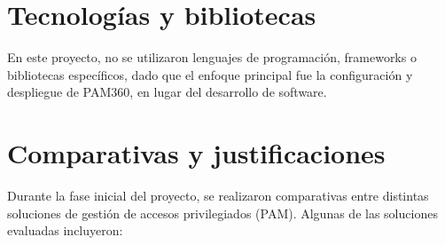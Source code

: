 \section{Tecnologías y bibliotecas}

En este proyecto, no se utilizaron lenguajes de programación, frameworks o bibliotecas específicos, dado que el enfoque principal fue la configuración y despliegue de PAM360, en lugar del desarrollo de software. 

\section{Comparativas y justificaciones}

Durante la fase inicial del proyecto, se realizaron comparativas entre distintas soluciones de gestión de accesos privilegiados (PAM). Algunas de las soluciones evaluadas incluyeron:

